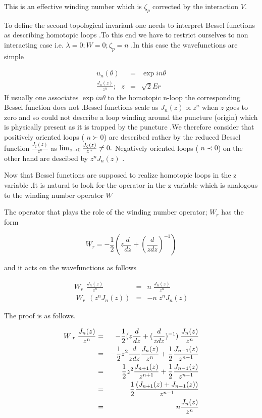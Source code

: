 \documentclass[a4paper,11pt]{article}
\begin{document}
This is an effective winding number which is $\zeta _{p}$ corrected by the
interaction $V$.

To define the second topological invariant one needs to interpret Bessel
functions as describing homotopic loops .To this end we have to restrict
ourselves to non interacting case i.e. $\lambda =0;W=0;\zeta _{p}=n$ .In
this case the wavefunctions are simple

\begin{eqnarray*}
u_{n}(\theta ) &=&\exp in\theta \\
\frac{J_{n}(z)}{z^{n}};\textrm{ }z &=&\sqrt{2}Er
\end{eqnarray*}%
If usually one associates $\exp in\theta $ to the homotopic n-loop the
corresponding Bessel function does not .Bessel functions scale as $%
J_{n}(z)\propto z^{n}$ when $z$ goes to zero and so could not describe a
loop winding around the puncture (origin) which is physically present as it
is trapped by the puncture .We therefore consider that positively oriented
loops ( $n\succ 0$) are described rather by the reduced Bessel function $%
\frac{J_{\zeta }(z)}{z^{n}}$ as $\lim_{z\rightarrow 0}\frac{J_{\zeta }(z)}{%
z^{n}}\neq 0.$ Negatively oriented loops ( $n\prec 0$) on the other hand are
descibed by $z^{n}J_{n}(z)$ .

Now that Bessel functions are supposed to realize homotopic loops in the z
variable .It is natural to look for the operator in the z variable which is
analogous to the winding number operator $W$

The operator that plays the role of the winding number operator; $W_{r}$ has
the form

\[
W_{r}=-\frac{1}{2}(z\frac{d}{dz}+(\frac{d}{zdz})^{-1}) 
\]

and it acts on the wavefunctions as follows

\begin{eqnarray*}
W_{r}\,\;\frac{J_{n}(z)}{z^{n}} &=&n\;\frac{J_{n}(z)}{z^{n}}\quad \\
\;W_{r}\,\;(z^{n}J_{n}(z)) &=&-n\;z^{n}J_{n}(z)
\end{eqnarray*}

The proof is as follows.

\begin{eqnarray*}
W\,_{r}\;\frac{J_{n}(z)}{z^{n}} &=&-\frac{1}{2}(z\frac{d}{dz}+(\frac{d}{zdz}%
)^{-1})\;\frac{J_{n}(z)}{z^{n}} \\
&=&-\frac{1}{2}z^{2}\frac{d}{zdz}\frac{J_{n}(z)}{z^{n}}+\frac{1}{2}\frac{%
J_{n-1}(z)}{z^{n-1}} \\
&=&\frac{1}{2}z^{2}\frac{J_{n+1}(z)}{z^{n+1}}+\frac{1}{2}\frac{J_{n-1}(z)}{%
z^{n-1}} \\
&=&\frac{1}{2}\frac{(J_{n+1}(z)+J_{n-1}(z))}{z^{n-1}} \\
&=&n\frac{J_{n}(z)}{z^{n}}
\end{eqnarray*}
\end{document}
